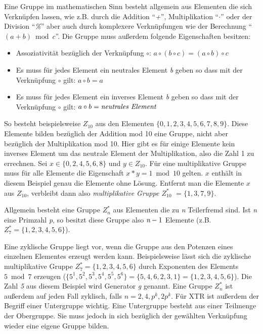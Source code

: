 \documentclass[10pt,        %
               a4paper,     %
               journal,     %
               ]{IEEEtran}
\begin{document}
Eine Gruppe im mathematischen Sinn besteht allgemein aus Elementen die sich Verknüpfen lassen, wie z.B. durch die Addition "`\emph{+}"', 
Multiplikation "`\emph{$\cdot$}"' oder der Division "`\emph{\%}"' aber auch durch komplexere Verknüpfungen wie der Berechnung "`$(a+b) \bmod c$"'. Die Gruppe muss außerdem folgende Eigenschaften besitzen\cite{gruppe}:

\begin{itemize}
	\item Assoziativität bezüglich der Verknüpfung $\circ$: $a \circ (b \circ c) = (a \circ b) \circ c$
	\item Es muss für jedes Element ein neutrales Element \emph{b} geben so dass mit der Verknüpfung $\circ$ gilt: $a \circ b = a$ 
	\item Es muss für jedes Element ein inverses Element \emph{b} geben so dass mit der Verknüpfung $\circ$ gilt: $a \circ b = \emph{neutrales Element}$
\end{itemize}

So besteht beispielsweise $Z_{10}$ aus den Elementen $\{0,1,2,3,4,5,6,7,8,9\}$. Diese Elemente bilden bezüglich der Addition mod 10 eine Gruppe, nicht aber bezüglich der Multiplikation mod 10. Hier gibt es für einige Elemente kein inverses Element um das neutrale Element der Multiplikation, also die Zahl 1 zu errechnen. 
Sei $x \in \{0,2,4,5,6,8\}$ und $y \in Z_{10}$. Für eine multiplikative Gruppe muss für alle Elemente die Eigenschaft $x * y = 1 \bmod 10$ gelten.
$x$ enthält in diesem Beispiel genau die Elemente ohne Lösung.
Entfernt man die Elemente $x$ aus $Z_{10}$, verbleibt dann also \emph{multiplikative Gruppe $Z_{10}^*$} $= \{1,3,7,9\}$\cite{mulgruppe}.

Allgemein besteht eine Gruppe $Z_n^*$ aus Elementen die zu \emph{n} Teilerfremd sind. Ist \emph{n} eine Primzahl \emph{p},
so besitzt diese Gruppe also $\emph{n}-1$ Elemente (z.B. $Z_7^* = \{1,2,3,4,5,6\}$).

Eine zyklische Gruppe liegt vor, wenn die Gruppe aus den Potenzen eines einzelnen Elementes erzeugt werden kann. Beispielsweise lässt sich die zyklische multiplikative Gruppe $Z_7^* = \{1,2,3,4,5,6\}$ durch Exponenten des Elements $5 \bmod 7$ erzeugen ($\{ 5^1, 5^2, 5^3, 5^4, 5^5, 5^6\}  = \{5, 4, 6, 2, 3, 1\} = \{1, 2, 3, 4, 5, 6\}$). Die Zahl \emph{5} aus diesem Beispiel wird Generator \emph{g} genannt. Eine Gruppe $Z_n^*$ ist außerdem auf jeden Fall zyklisch, falls $n = 2, 4, p^k, 2p^k$. Für XTR ist außerdem der Begriff einer Untergruppe wichtig. Eine Untergruppe besteht aus einer Teilmenge der Obergruppe. Sie muss jedoch in sich bezüglich der gewählten Verknüpfung wieder eine eigene Gruppe bilden.
\end{document}
